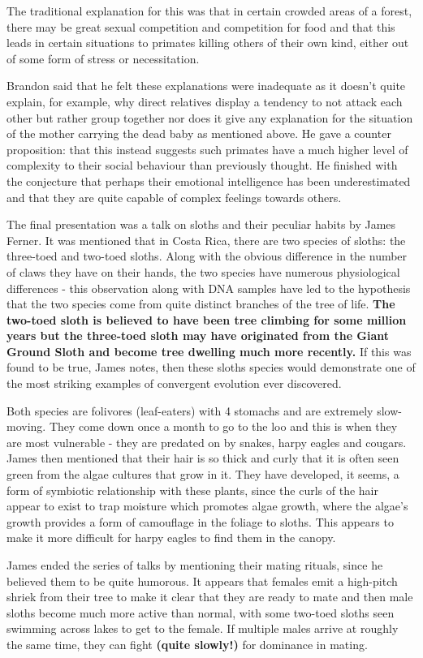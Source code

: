 \documentclass[11pt,a4paper]{report}
\newcounter{count}
\begin{document}
\begin{multicols}{2}
The traditional explanation for this was that in certain crowded areas
of a forest, there may be great sexual competition and competition for
food and that this leads in certain situations to primates killing
others of their own kind, either out of some form of stress or
necessitation.

Brandon said that he felt these explanations were inadequate as it
doesn't quite explain, for example, why direct relatives display a
tendency to not attack each other but rather group together nor does it
give any explanation for the situation of the mother carrying the dead
baby as mentioned above. He gave a counter proposition: that this
instead suggests such primates have a much higher level of complexity to
their social behaviour than previously thought. He finished with the
conjecture that perhaps their emotional intelligence has been
underestimated and that they are quite capable of complex feelings
towards others.

The final presentation was a talk on sloths and their peculiar habits by
James Ferner. It was mentioned that in Costa Rica, there are two species
of sloths: the three-toed and two-toed sloths. Along with the obvious
difference in the number of claws they have on their hands, the two
species have numerous physiological differences - this observation along
with DNA samples have led to the hypothesis that the two species come
from quite distinct branches of the tree of life.
\textbf{The two-toed sloth is believed to have been tree climbing for some million years but the three-toed sloth may have originated from the Giant Ground Sloth and become tree dwelling much more recently.}
If this was found to be true, James notes, then these sloths species
would demonstrate one of the most striking examples of convergent
evolution ever discovered.

Both species are folivores (leaf-eaters) with 4 stomachs and are
extremely slow-moving. They come down once a month to go to the loo and
this is when they are most vulnerable - they are predated on by snakes,
harpy eagles and cougars. James then mentioned that their hair is so
thick and curly that it is often seen green from the algae cultures that
grow in it. They have developed, it seems, a form of symbiotic
relationship with these plants, since the curls of the hair appear to
exist to trap moisture which promotes algae growth, where the algae's
growth provides a form of camouflage in the foliage to sloths. This
appears to make it more difficult for harpy eagles to find them in the
canopy.

James ended the series of talks by mentioning their mating rituals,
since he believed them to be quite humorous. It appears that females
emit a high-pitch shriek from their tree to make it clear that they are
ready to mate and then male sloths become much more active than normal,
with some two-toed sloths seen swimming across lakes to get to the
female. If multiple males arrive at roughly the same time, they can
fight \textbf{(quite slowly!)} for dominance in mating.

\end{multicols}
\end{document}
